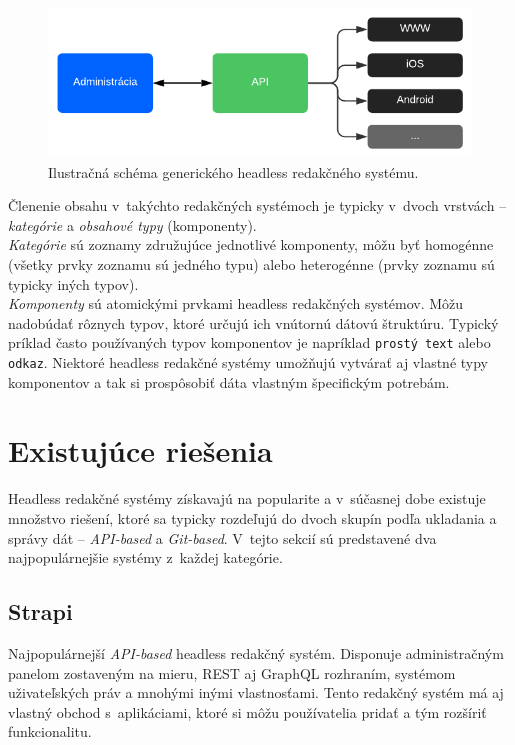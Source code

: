 \begin{figure}[h]
	\centering
	\includegraphics{obrazky-figures/headless_cms_graph.pdf}
	\caption{Ilustračná schéma generického headless redakčného systému.}
\end{figure}

\noindent Členenie obsahu v~takýchto redakčných systémoch je typicky v~dvoch vrstvách -- \emph{kategórie} a \emph{obsahové typy} (komponenty). \\

\noindent \emph{Kategórie} sú zoznamy združujúce jednotlivé komponenty, môžu byť homogénne (všetky prvky zoznamu sú jedného typu) alebo heterogénne (prvky zoznamu sú typicky iných typov). \\

\noindent \emph{Komponenty} sú atomickými prvkami headless redakčných systémov. Môžu nadobúdať rôznych typov, ktoré určujú ich vnútornú dátovú štruktúru. Typický príklad často používaných typov komponentov je napríklad \texttt{prostý text} alebo \texttt{odkaz}. Niektoré headless redakčné systémy umožňujú vytvárať aj vlastné typy komponentov a tak si prospôsobiť dáta vlastným špecifickým potrebám.

\section{Existujúce riešenia}
Headless redakčné systémy získavajú na popularite a v~súčasnej dobe existuje množstvo riešení, ktoré sa typicky rozdeľujú do dvoch skupín podľa ukladania a správy dát -- \emph{API-based} a \emph{Git-based}. V~tejto sekcií sú predstavené dva najpopulárnejšie systémy z~každej kategórie.

\subsection{Strapi}
Najpopulárnejší \emph{API-based} headless redakčný systém. Disponuje administračným panelom zostaveným na mieru, REST aj GraphQL rozhraním, systémom uživateľských práv a mnohými inými vlastnosťami. Tento redakčný systém má aj vlastný obchod s~aplikáciami, ktoré si môžu používatelia pridať a tým rozšíriť funkcionalitu. 

